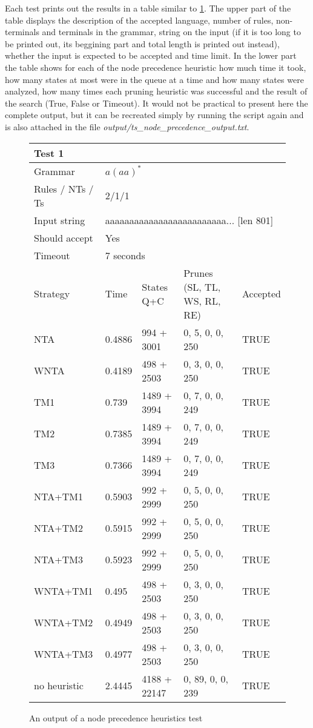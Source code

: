 Each test prints out the results in a table similar to \ref{tab:node_heuristics_table}. The upper part of the table displays the description of the accepted language, number of rules, non-terminals and terminals in the grammar, string on the input (if it is too long to be printed out, its beggining part and total length is printed out instead), whether the input is expected to be accepted and time limit. In the lower part the table shows for each of the node precedence heuristic how much time it took, how many states at most were in the queue at a time and how many states were analyzed, how many times each pruning heuristic was successful and the result of the search (True, False or Timeout). It would not be practical to present here the complete output, but it can be recreated simply by running the script again and is also attached in the file \textit{output/ts\_node\_precedence\_output.txt}.

\begin{figure}[h!]
  \caption{An output of a node precedence heuristics test}
  \label{tab:node_heuristics_table}
\begin{tabular}{ |l|l|l|l|l|  }
  \hline
  \multicolumn{5}{|l|}{Test 1} \\
  \hline
  Grammar & \multicolumn{4}{|l|}{$a(aa)^*$} \\
  Rules / NTs / Ts & \multicolumn{4}{|l|}{2/1/1} \\
  Input string & \multicolumn{4}{|l|}{aaaaaaaaaaaaaaaaaaaaaaaaa... [len 801]} \\
  Should accept & \multicolumn{4}{|l|}{Yes} \\
  Timeout & \multicolumn{4}{|l|}{7 seconds} \\
  \hline
  Strategy & Time & States Q+C & Prunes (SL, TL, WS, RL, RE)& Accepted \\
  \hline
 NTA & 0.4886 & 994 + 3001  & 0, 5, 0, 0, 250 & TRUE \\
 WNTA & 0.4189 & 498 + 2503 & 0, 3, 0, 0, 250 & TRUE  \\
 TM1 & 0.739 & 1489 + 3994 & 0, 7, 0, 0, 249  & TRUE  \\
 TM2 & 0.7385 & 1489 + 3994 & 0, 7, 0, 0, 249 & TRUE  \\
 TM3 & 0.7366 & 1489 + 3994 & 0, 7, 0, 0, 249  & TRUE  \\
 NTA+TM1 & 0.5903 & 992 + 2999 & 0, 5, 0, 0, 250 & TRUE  \\
 NTA+TM2 & 0.5915 & 992 + 2999 & 0, 5, 0, 0, 250 & TRUE  \\
 NTA+TM3 & 0.5923 & 992 + 2999 & 0, 5, 0, 0, 250 & TRUE  \\
 WNTA+TM1 & 0.495 & 498 + 2503 & 0, 3, 0, 0, 250 & TRUE  \\
 WNTA+TM2 & 0.4949 & 498 + 2503 & 0, 3, 0, 0, 250 & TRUE  \\
 WNTA+TM3 & 0.4977 & 498 + 2503 & 0, 3, 0, 0, 250 & TRUE  \\
 no heuristic & 2.4445 & 4188 + 22147 & 0, 89, 0, 0, 239 & TRUE  \\
  \hline
  \hline
\end{tabular}
\end{figure}

